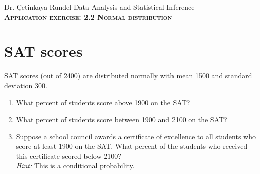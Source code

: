 \documentclass[11pt]{article}
\newcommand{\ttl}[1]{ \textsc{{\LARGE \textbf{{\color{oiB} #1} } }}}
\begin{document}
Dr. \c{C}etinkaya-Rundel \hfill Data Analysis and Statistical Inference \\

\ttl{Application exercise: 2.2 Normal distribution} 

\section*{SAT scores}

SAT scores (out of 2400) are distributed normally with mean 1500 and standard deviation 300. 

\begin{enumerate}

\item What percent of students score above 1900 on the SAT?

\item What percent of students score between 1900 and 2100 on the SAT?

\item Suppose a school council awards a certificate of excellence to all students who score at least 1900 on the SAT. What percent of the students who received this certificate scored below 2100? \\
\textit{Hint:} This is a conditional probability.


\end{enumerate}

%
\end{document}
